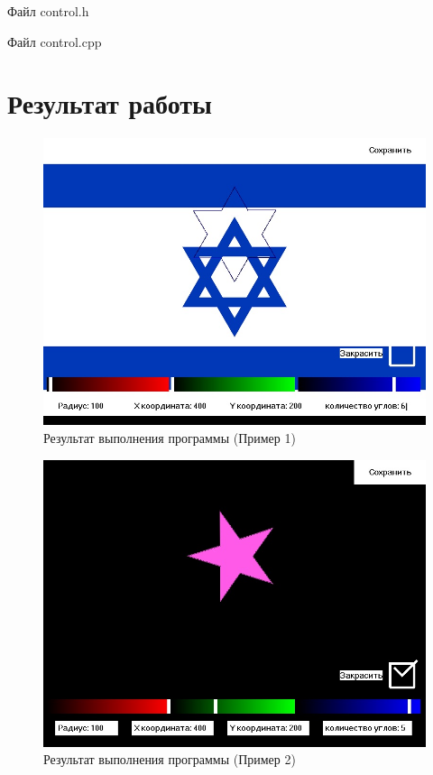 \documentclass[14pt, a4paper]{extreport}
\begin{document}
\noindent Файл control.h

\hrulefill

\noindent Файл control.cpp


\chapter{Результат работы}

\begin{figure}[h!]
	\centering
	\includegraphics[width = 12cm]{image/image_1}
  \caption{Результат выполнения программы (Пример 1)}
\end{figure}

\begin{figure}[h!]
	\centering
	\includegraphics[width = 12cm]{image/image_2}
  \caption{Результат выполнения программы (Пример 2)}
\end{figure}
\end{document}
